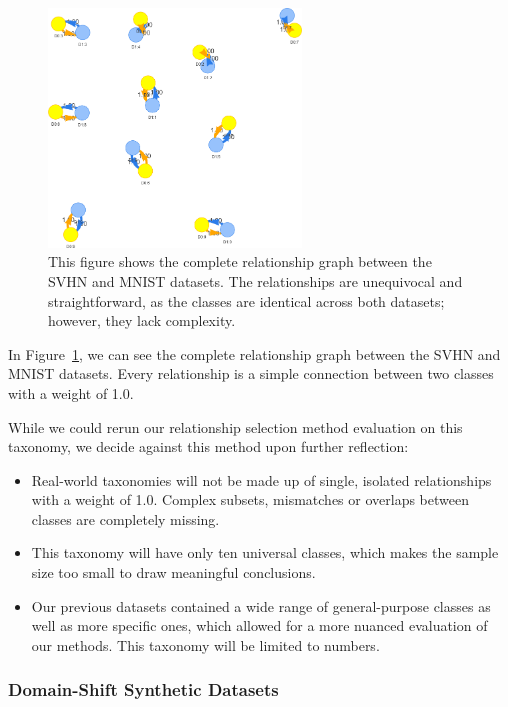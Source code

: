 \begin{figure}[H]
      \centering
      \includegraphics[width=0.6\textwidth]{figures/svhn_mnist.png}

      \caption{This figure shows the complete relationship graph between the SVHN and MNIST datasets.
            The relationships are unequivocal and straightforward, as the classes are identical across both datasets;
            however, they lack complexity.}
      \label{fig:svhn_mnist}
\end{figure}

In Figure~\ref{fig:svhn_mnist}, we can see the complete relationship graph between the SVHN and MNIST datasets.
Every relationship is a simple connection between two classes with a weight of 1.0.

While we could rerun our relationship selection method evaluation on this taxonomy,
we decide against this method upon further reflection:
\begin{itemize}
      \item Real-world taxonomies will not be made up of single, isolated relationships
            with a weight of 1.0. Complex subsets, mismatches or overlaps between classes are completely missing.
      \item This taxonomy will have only ten universal classes, which makes the sample size too small to draw meaningful conclusions.
      \item Our previous datasets contained a wide range of general-purpose classes as well as more specific ones, which allowed for a more nuanced evaluation of our methods.
            This taxonomy will be limited to numbers.
\end{itemize}

\subsubsection{Domain-Shift Synthetic Datasets}

